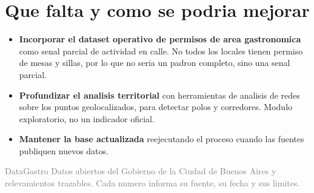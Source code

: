 \documentclass[11pt,a4paper]{article}
\begin{document}
\section*{Que falta y como se podria mejorar}
\begin{itemize}[leftmargin=*]
\item \textbf{Incorporar el dataset operativo de permisos de area gastronomica} como senal parcial de actividad en calle. No todos los locales tienen permiso de mesas y sillas, por lo que no seria un padron completo, sino una senal parcial.
\item \textbf{Profundizar el analisis territorial} con herramientas de analisis de redes sobre los puntos geolocalizados, para detectar polos y corredores. Modulo exploratorio, no un indicador oficial.
\item \textbf{Mantener la base actualizada} reejecutando el proceso cuando las fuentes publiquen nuevos datos.
\end{itemize}

\vspace{6pt}
\noindent\footnotesize\textcolor{gray}{DataGastro \textperiodcentered{} Datos abiertos del Gobierno de la Ciudad de Buenos Aires y relevamientos trazables. Cada numero informa su fuente, su fecha y sus limites.}
\end{document}
